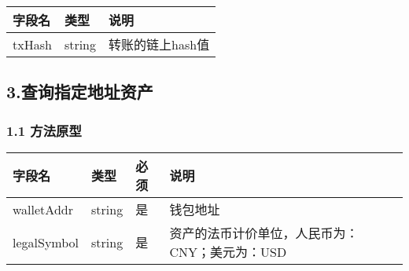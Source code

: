 \documentclass[letterpaper,10pt,english]{sphinxmanual}
\begin{document}


\begin{savenotes}\sphinxattablestart
\centering
\begin{tabulary}{\linewidth}[t]{|T|T|T|}
\hline
\sphinxstyletheadfamily 
字段名
&\sphinxstyletheadfamily 
类型
&\sphinxstyletheadfamily 
说明
\\
\hline
txHash
&
string
&
转账的链上hash值
\\
\hline
\end{tabulary}
\par
\sphinxattableend\end{savenotes}


\begin{sphinxVerbatim}[commandchars=\\\{\}]
     
\end{sphinxVerbatim}


\subsection{3.查询指定地址资产}
\label{\detokenize{BCBWalletSDK_u63a5_u53e3_u8bf4_u660e:id66}}

\subsubsection{1.1 方法原型}
\label{\detokenize{BCBWalletSDK_u63a5_u53e3_u8bf4_u660e:id67}}



\begin{savenotes}\sphinxattablestart
\centering
\begin{tabulary}{\linewidth}[t]{|T|T|T|T|}
\hline
\sphinxstyletheadfamily 
字段名
&\sphinxstyletheadfamily 
类型
&\sphinxstyletheadfamily 
必须
&\sphinxstyletheadfamily 
说明
\\
\hline
walletAddr
&
string
&
是
&
钱包地址
\\
\hline
legalSymbol
&
string
&
是
&
资产的法币计价单位，人民币为：CNY；美元为：USD
\\
\hline
\end{tabulary}
\par
\sphinxattableend\end{savenotes}
\end{document}

